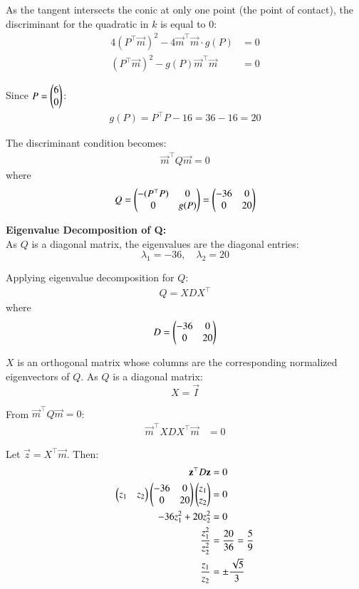\documentclass[article]{IEEEtran}
\begin{document}
	As the tangent intersects the conic at only one point (the point of contact), the discriminant for the quadratic in $k$ is equal to 0:
	\begin{align}
		4(P^\top\vec{m})^2 - 4\vec{m}^\top\vec{m} \cdot g(P) &= 0\\
		(P^\top\vec{m})^2 - g(P)\vec{m}^\top\vec{m} &= 0
	\end{align}
	
	Since $P = \begin{pmatrix}6\\0\end{pmatrix}$:
	\begin{align}
		g(P) = P^\top P - 16 = 36 - 16 = 20
	\end{align}
	
	The discriminant condition becomes:
	\begin{align}
		\vec{m}^\top Q\vec{m} = 0
	\end{align}
	where
	\begin{align}
		Q = \begin{pmatrix}-(P^\top P) & 0\\0 & g(P)\end{pmatrix} = \begin{pmatrix}-36 & 0\\0 & 20\end{pmatrix}
	\end{align}
	
	\textbf{Eigenvalue Decomposition of Q:}\\
	As $Q$ is a diagonal matrix, the eigenvalues are the diagonal entries:
	\begin{equation}
		\lambda_1 = -36, \quad \lambda_2 = 20
	\end{equation}
	
	Applying eigenvalue decomposition for $Q$:
	\begin{align}
		Q = XDX^\top
	\end{align}
	where
	\begin{align}
		D = \begin{pmatrix}-36 & 0\\0 & 20\end{pmatrix}
	\end{align}
	
	$X$ is an orthogonal matrix whose columns are the corresponding normalized eigenvectors of $Q$. As $Q$ is a diagonal matrix:
	\begin{equation}
		X = \vec{I}
	\end{equation}
	
	From $\vec{m}^\top Q\vec{m} = 0$:
	\begin{align}
		\vec{m}^\top XDX^\top\vec{m} &= 0
	\end{align}
	
	Let $\vec{z} = X^\top\vec{m}$. Then:
	\begin{align}
		\mathbf{z}^\top D\mathbf{z} &= 0\\
		\begin{pmatrix}z_1 & z_2\end{pmatrix}\begin{pmatrix}-36 & 0\\0 & 20\end{pmatrix}\begin{pmatrix}z_1\\z_2\end{pmatrix} &= 0\\
		-36z_1^2 + 20z_2^2 &= 0\\
		\frac{z_1^2}{z_2^2} &= \frac{20}{36} = \frac{5}{9}\\
		\frac{z_1}{z_2} &= \pm\frac{\sqrt{5}}{3}
	\end{align}
	
\end{document}
